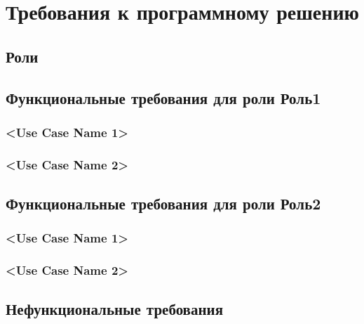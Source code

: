 \chapter{Требования к программному решению}
	\section{Роли}

	\section{Функциональные требования для роли Роль1}
		\subsection{<Use Case Name 1>}

		\subsection{<Use Case Name 2>}
	\section{Функциональные требования для роли Роль2}
		\subsection{<Use Case Name 1>}

		\subsection{<Use Case Name 2>}

	\section{Нефункциональные требования}
